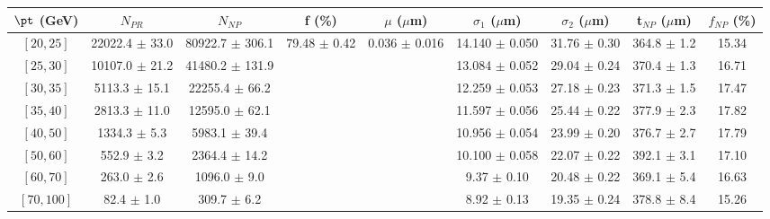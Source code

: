 \begin{tabular}{c||c|c|c|c|c|c|c||c}
$\pt$ (GeV) & $N_{PR}$ & $N_{NP}$ & f (\%) & $\mu$ ($\mu$m) & $\sigma_1$ ($\mu$m) & $\sigma_2$ ($\mu$m)  & t$_{NP}$ ($\mu$m) & $f_{NP}$ (\%) \\
\hline
$[20, 25]$ & 22022.4 $\pm$ 33.0 & 80922.7 $\pm$ 306.1 & \multirow{8}{*}{79.48 $\pm$ 0.42} & \multirow{8}{*}{0.036 $\pm$ 0.016} & 14.140 $\pm$ 0.050 & 31.76 $\pm$ 0.30 & 364.8 $\pm$ 1.2 & 15.34\\
$[25, 30]$ & 10107.0 $\pm$ 21.2 & 41480.2 $\pm$ 131.9 &  &  & 13.084 $\pm$ 0.052 & 29.04 $\pm$ 0.24 & 370.4 $\pm$ 1.3 & 16.71\\
$[30, 35]$ & 5113.3 $\pm$ 15.1 & 22255.4 $\pm$ 66.2 &  &  & 12.259 $\pm$ 0.053 & 27.18 $\pm$ 0.23 & 371.3 $\pm$ 1.5 & 17.47\\
$[35, 40]$ & 2813.3 $\pm$ 11.0 & 12595.0 $\pm$ 62.1 &  &  & 11.597 $\pm$ 0.056 & 25.44 $\pm$ 0.22 & 377.9 $\pm$ 2.3 & 17.82\\
$[40, 50]$ & 1334.3 $\pm$ 5.3 & 5983.1 $\pm$ 39.4 &  &  & 10.956 $\pm$ 0.054 & 23.99 $\pm$ 0.20 & 376.7 $\pm$ 2.7 & 17.79\\
$[50, 60]$ & 552.9 $\pm$ 3.2 & 2364.4 $\pm$ 14.2 &  &  & 10.100 $\pm$ 0.058 & 22.07 $\pm$ 0.22 & 392.1 $\pm$ 3.1 & 17.10\\
$[60, 70]$ & 263.0 $\pm$ 2.6 & 1096.0 $\pm$ 9.0 &  &  & 9.37 $\pm$ 0.10 & 20.48 $\pm$ 0.22 & 369.1 $\pm$ 5.4 & 16.63\\
$[70, 100]$ & 82.4 $\pm$ 1.0 & 309.7 $\pm$ 6.2 &  &  & 8.92 $\pm$ 0.13 & 19.35 $\pm$ 0.24 & 378.8 $\pm$ 8.4 & 15.26\\
\end{tabular}
